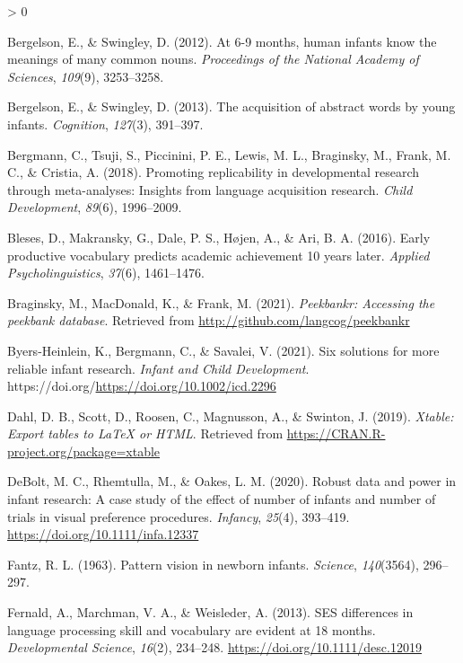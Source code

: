 \documentclass[
  english,
  man,floatsintext]{apa6}
\newlength{\cslhangindent}
\newenvironment{CSLReferences}[2] %
 {%
  \setlength{\parindent}{0pt}
  \ifodd #1 \everypar{\setlength{\hangindent}{\cslhangindent}}\ignorespaces\fi
  \ifnum #2 > 0
  \setlength{\parskip}{#2\baselineskip}
  \fi
 }%
 {}
\begin{document}
\begin{CSLReferences}{1}{0}
\leavevmode\hypertarget{ref-bergelson2012}{}%
Bergelson, E., \& Swingley, D. (2012). {At 6-9 months, human infants know the meanings of many common nouns.} \emph{Proceedings of the National Academy of Sciences}, \emph{109}(9), 3253--3258.

\leavevmode\hypertarget{ref-bergelson2013}{}%
Bergelson, E., \& Swingley, D. (2013). {{T}he acquisition of abstract words by young infants}. \emph{Cognition}, \emph{127}(3), 391--397.

\leavevmode\hypertarget{ref-bergmann2018}{}%
Bergmann, C., Tsuji, S., Piccinini, P. E., Lewis, M. L., Braginsky, M., Frank, M. C., \& Cristia, A. (2018). {Promoting replicability in developmental research through meta-analyses: Insights from language acquisition research}. \emph{Child Development}, \emph{89}(6), 1996--2009.

\leavevmode\hypertarget{ref-bleses2016}{}%
Bleses, D., Makransky, G., Dale, P. S., Højen, A., \& Ari, B. A. (2016). {Early productive vocabulary predicts academic achievement 10 years later}. \emph{Applied Psycholinguistics}, \emph{37}(6), 1461--1476.

\leavevmode\hypertarget{ref-R-peekbankr}{}%
Braginsky, M., MacDonald, K., \& Frank, M. (2021). \emph{Peekbankr: Accessing the peekbank database}. Retrieved from \url{http://github.com/langcog/peekbankr}

\leavevmode\hypertarget{ref-Byers-Heinlein2021}{}%
Byers-Heinlein, K., Bergmann, C., \& Savalei, V. (2021). {Six solutions for more reliable infant research.} \emph{Infant and Child Development}. https://doi.org/\url{https://doi.org/10.1002/icd.2296}

\leavevmode\hypertarget{ref-R-xtable}{}%
Dahl, D. B., Scott, D., Roosen, C., Magnusson, A., \& Swinton, J. (2019). \emph{Xtable: Export tables to LaTeX or HTML}. Retrieved from \url{https://CRAN.R-project.org/package=xtable}

\leavevmode\hypertarget{ref-DeBolt2020}{}%
DeBolt, M. C., Rhemtulla, M., \& Oakes, L. M. (2020). {Robust data and power in infant research: A case study of the effect of number of infants and number of trials in visual preference procedures}. \emph{Infancy}, \emph{25}(4), 393--419. \url{https://doi.org/10.1111/infa.12337}

\leavevmode\hypertarget{ref-Fantz1963}{}%
Fantz, R. L. (1963). {Pattern vision in newborn infants}. \emph{Science}, \emph{140}(3564), 296--297.

\leavevmode\hypertarget{ref-Fernald2013}{}%
Fernald, A., Marchman, V. A., \& Weisleder, A. (2013). {SES differences in language processing skill and vocabulary are evident at 18 months}. \emph{Developmental Science}, \emph{16}(2), 234--248. \url{https://doi.org/10.1111/desc.12019}


\end{CSLReferences}
\end{document}
